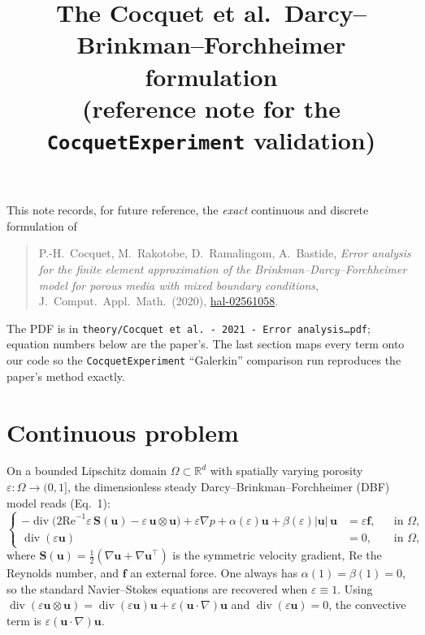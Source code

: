\documentclass[11pt]{article}
\title{The Cocquet et al.\ Darcy--Brinkman--Forchheimer formulation\\[2pt]
\large (reference note for the \texttt{CocquetExperiment} validation)}
\author{}
\date{}
\newcommand{\uu}{\bm{u}}
\newcommand{\ff}{\bm{f}}
\newcommand{\grad}{\nabla}
\newcommand{\dive}{\operatorname{div}}
\newcommand{\Reyn}{\mathrm{Re}}
\newcommand{\Sten}{\bm{S}}
\begin{document}
\maketitle

\noindent
This note records, for future reference, the \emph{exact} continuous and discrete formulation of
\begin{quote}
P.-H.\ Cocquet, M.\ Rakotobe, D.\ Ramalingom, A.\ Bastide,
\emph{Error analysis for the finite element approximation of the Brinkman--Darcy--Forchheimer model
for porous media with mixed boundary conditions}, J.\ Comput.\ Appl.\ Math.\ (2020),
\href{https://hal.univ-reunion.fr/hal-02561058}{hal-02561058}.
\end{quote}
The PDF is in \texttt{theory/Cocquet et al.\ - 2021 - Error analysis\ldots pdf}; equation numbers below
are the paper's. The last section maps every term onto our code so the
\texttt{CocquetExperiment} ``Galerkin'' comparison run reproduces the paper's method exactly.

\section{Continuous problem}

On a bounded Lipschitz domain $\Omega\subset\mathbb{R}^d$ with spatially varying porosity
$\varepsilon:\Omega\to(0,1]$, the dimensionless steady Darcy--Brinkman--Forchheimer (DBF) model
reads (Eq.~1):
\begin{equation}
\left\{
\begin{aligned}
-\dive\!\big(2\Reyn^{-1}\varepsilon\,\Sten(\uu) - \varepsilon\,\uu\otimes\uu\big)
   + \varepsilon\grad p + \alpha(\varepsilon)\uu + \beta(\varepsilon)|\uu|\,\uu
   &= \varepsilon\ff, && \text{in }\Omega,\\
\dive(\varepsilon\uu) &= 0, && \text{in }\Omega,
\end{aligned}
\right.
\end{equation}
where $\Sten(\uu)=\tfrac12(\grad\uu+\grad\uu^{\top})$ is the symmetric velocity gradient, $\Reyn$ the
Reynolds number, and $\ff$ an external force. One always has $\alpha(1)=\beta(1)=0$, so the standard
Navier--Stokes equations are recovered when $\varepsilon\equiv1$. Using
$\dive(\varepsilon\uu\otimes\uu)=\dive(\varepsilon\uu)\uu+\varepsilon(\uu\cdot\grad)\uu$ and
$\dive(\varepsilon\uu)=0$, the convective term is $\varepsilon(\uu\cdot\grad)\uu$.
\end{document}
